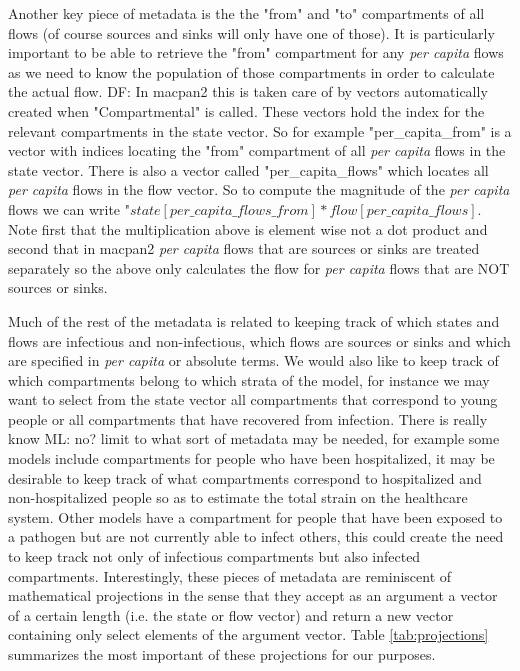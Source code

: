 \documentclass[pdflatex,sn-basic]{sn-jnl}%
\theoremstyle{definition}
\newcommand{\df}[1]{{\color{orange} DF: #1}}
\newcommand{\mli}[1]{{\color{purple} ML: #1}}
\begin{document}
Another key piece of metadata is the the "from" and "to" compartments of all flows (of course sources and sinks will only have one of those). It is particularly important to be able to retrieve the "from" compartment for any \emph{per capita} flows as we need to know the population of those compartments in order to calculate the actual flow. \df{In macpan2 this is taken care of by vectors automatically created when "Compartmental" is called. These vectors hold the index for the relevant compartments in the state vector. So for example "per\_capita\_from" is a vector with indices locating the  "from" compartment of all \emph{per capita} flows in the state vector. There is also a vector called "per\_capita\_flows" which locates all \emph{per capita} flows in the flow vector. So to compute the magnitude of the \emph{per capita} flows we can write "$state[per\_capita\_flows\_from] * flow[per\_capita\_flows]$. Note first that the multiplication above is element wise not a dot product and second that in macpan2 \emph{per capita} flows that are sources or sinks are treated separately so the above only calculates the flow for \emph{per capita} flows that are NOT sources or sinks.}

Much of the rest of the metadata is related to keeping track of which states and flows are infectious and non-infectious, which flows are sources or sinks and which are specified in \emph{per capita} or absolute terms. We would also like to keep track of which compartments belong to which strata of the model, for instance we may want to select from the state vector all compartments that correspond to young people or all compartments that have recovered from infection. There is really know \mli{no?} limit to what sort of metadata may be needed, for example some models include compartments for people who have been hospitalized, it may be desirable to keep track of what compartments correspond to hospitalized and non-hospitalized people so as to estimate the total strain on the healthcare system. Other models have a compartment for people that have been exposed to a pathogen but are not currently able to infect others, this could create the need to keep track not only of infectious compartments but also infected compartments. Interestingly, these pieces of metadata are reminiscent of mathematical projections in the sense that they accept as an argument a vector of a certain length (i.e. the state or flow vector) and return a new vector containing only select elements of the argument vector. Table \ref{tab:projections} summarizes the most important of these projections for our purposes.
\end{document}
